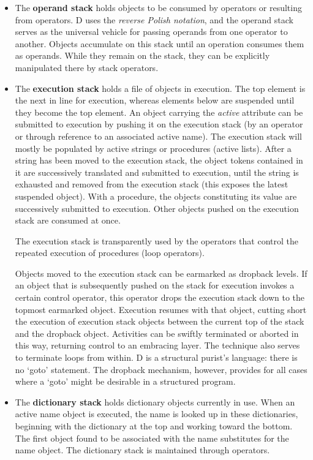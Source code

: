 \begin{itemize}
\item The \textbf{operand stack} holds objects to be consumed by operators or resulting from operators. D uses the \emph{reverse Polish notation}, and the operand stack serves as the universal vehicle for passing operands from one operator to another.  Objects  accumulate on this stack until an operation consumes them as operands.  While they remain on the stack,  they can  be explicitly manipulated there by stack operators.

\item The  \textbf{execution  stack}  holds a file of objects  in  execution.  The  top element  is the next in line for execution,  whereas elements  below  are suspended until they become the top element.  An  object carrying the \emph{active} attribute can be submitted  to execution by pushing it on the execution stack (by an operator or through reference  to  an associated active name).  The execution stack  will  mostly be populated by active strings or procedures (active lists).  After a string has been moved to the execution stack,  the object tokens contained in it are successively translated and submitted to execution,  until the string is  exhausted  and  removed from the execution stack  (this  exposes  the latest suspended object).  With a procedure, the objects constituting its value  are successively submitted to execution.  Other objects pushed  on the execution stack are consumed at once.

The  execution  stack  is transparently used by the operators  that  control  the repeated  execution  of procedures (loop operators). 

Objects  moved  to  the execution stack can  be  earmarked  as  dropback levels.  If  an  object that is subsequently pushed on the  stack  for  execution invokes  a certain control operator,  this operator drops  the  execution stack  down to the topmost earmarked object. Execution resumes with that object, cutting short the execution of execution stack objects between the current top of the stack and the dropback object.  Activities can be swiftly terminated or  aborted in this way,  returning control to an  embracing  layer.  The technique also serves to terminate loops from within.  D is a  structural purist's language:  there is no `goto' statement. The dropback mechanism, however,  provides  for all cases where a `goto' might be desirable in  a structured program.

\item The \textbf{dictionary stack} holds dictionary objects currently in use.  When  an active  name  object  is  executed,  the  name  is  looked  up  in  these dictionaries,  beginning  with the dictionary at the top and working toward the bottom.  The first  object  found to be associated with the name substitutes  for  the name  object.  The  dictionary  stack is  maintained  through operators.


\end{itemize}
